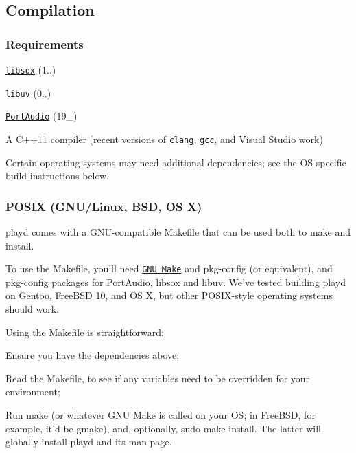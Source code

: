 \subsection*{Compilation}

\subsubsection*{Requirements}


\begin{DoxyItemize}
\item \href{http://sox.sourceforge.net/}{\tt libsox} (1..)
\item \href{https://github.com/joyent/libuv}{\tt libuv} (0..)
\item \href{http://www.portaudio.com/}{\tt Port\+Audio} (19\+\_)
\item A C++11 compiler (recent versions of \href{http://clang.llvm.org/}{\tt clang}, \href{https://gcc.gnu.org/}{\tt gcc}, and Visual Studio work)
\end{DoxyItemize}

Certain operating systems may need additional dependencies; see the O\+S-\/specific build instructions below.

\subsubsection*{P\+O\+S\+I\+X (G\+N\+U/\+Linux, B\+S\+D, O\+S X)}

{\ttfamily playd} comes with a G\+N\+U-\/compatible Makefile that can be used both to make and install.

To use the Makefile, you'll need \href{https://www.gnu.org/software/make/}{\tt G\+N\+U Make} and {\ttfamily pkg-\/config} (or equivalent), and pkg-\/config packages for Port\+Audio, libsox and libuv. We've tested building playd on Gentoo, Free\+B\+S\+D 10, and O\+S X, but other P\+O\+S\+I\+X-\/style operating systems should work.

Using the Makefile is straightforward\+:


\begin{DoxyItemize}
\item Ensure you have the dependencies above;
\item Read the {\ttfamily Makefile}, to see if any variables need to be overridden for your environment;
\item Run {\ttfamily make} (or whatever G\+N\+U Make is called on your O\+S; in Free\+B\+S\+D, for example, it'd be {\ttfamily gmake}), and, optionally, {\ttfamily sudo make install}. The latter will globally install playd and its man page.
\end{DoxyItemize}


